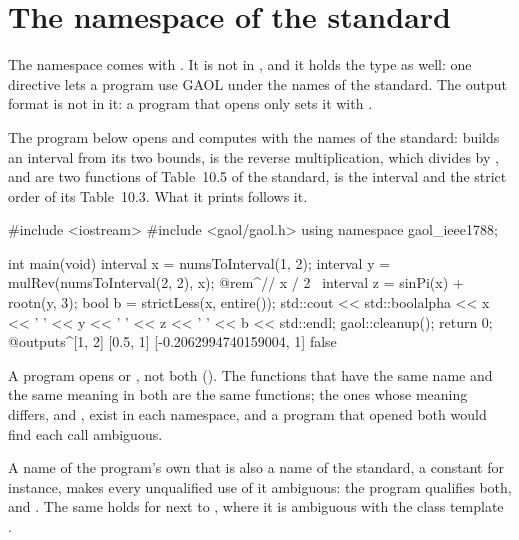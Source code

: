 \section{The namespace of the standard}\label{sec:ieee1788-namespace}

The namespace  comes with . It is not in
, and it holds
the type  as well: one directive lets a program use GAOL under
the names of the standard. The output format is not in it: a program that opens
only  sets it with
.\newinvfive

\begin{Ex}\label{ex:ieee1788-program}
The program below opens  and computes with the names of
the standard:  builds an interval from its two bounds,
 is the reverse multiplication, which divides  by
,  and  are two functions of Table~10.5 of
the standard,  is the interval \itv{-\infty}{+\infty} and
 the strict order of its Table~10.3. What it prints
follows it.
\begin{example}
#include <iostream>
#include <gaol/gaol.h>
using namespace gaol_ieee1788;

int main(void)
{
  interval x = numsToInterval(1, 2);
  interval y = mulRev(numsToInterval(2, 2), x);   @rem^// x / 2~
  interval z = sinPi(x) + rootn(y, 3);
  bool b = strictLess(x, entire());
  std::cout << std::boolalpha
            << x << ' ' << y << ' ' << z << ' ' << b << std::endl;
  gaol::cleanup();
  return 0;
}
@outputs^[1, 2] [0.5, 1] [-0.2062994740159004, 1] false~
\end{example}
\end{Ex}

\medskip
\noindent
A program opens  or , not both
(). The functions that have the same name and the same
meaning in both are the same functions; the ones whose meaning differs,
 and , exist in each namespace, and a program
that opened both would find each call ambiguous.

\begin{Rem}\label{rem:ieee1788-shadow}
A name of the program's own that is also a name of the standard, a constant
 for instance, makes every unqualified use of it ambiguous: the
program qualifies both,  and .
The same holds for  next to , where it is
ambiguous with the class template .
\end{Rem}

